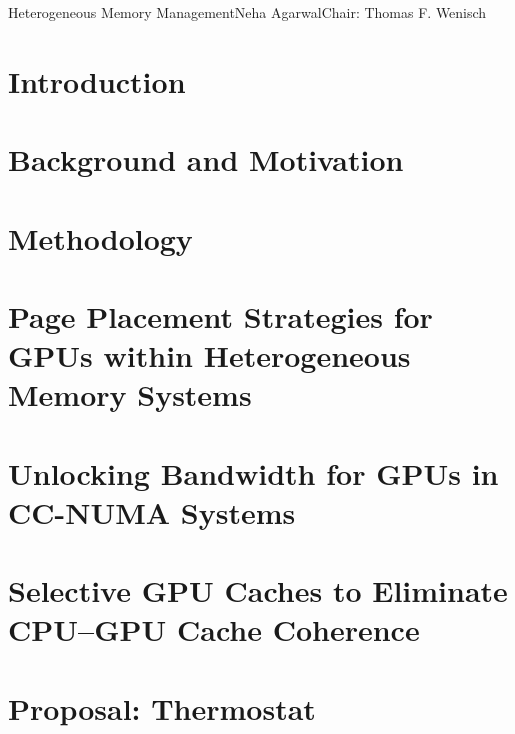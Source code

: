 \documentclass[reqno,12pt,oneside]{umdiss2-proposal} %
\theoremstyle{plain}
\theoremstyle{definition}
\theoremstyle{remark}
\numberwithin{theorem}{chapter}     %
\begin{document}
\startabstractpage
{Heterogeneous Memory Management}{Neha Agarwal}{Chair: Thomas F. Wenisch}

\label{abstract}

\startthechapters 

 \chapter{Introduction}
 \label{chap:intro}
 

 \chapter{Background and Motivation}
 \label{chap:background}
 

 \chapter{Methodology}
 \label{chap:methodology}
 

 \chapter{Page Placement Strategies for GPUs within Heterogeneous
Memory Systems}
 \label{chap:asplos2015}
 

 \chapter{Unlocking Bandwidth for GPUs in CC-NUMA Systems}
 \label{chap:hpca2015}
 

 \chapter{Selective GPU Caches to Eliminate CPU--GPU Cache Coherence}
 \label{chap:hpca2016}
 

 \chapter{Proposal: Thermostat}
 \label{chap:thermostat}
 
\end{document}
